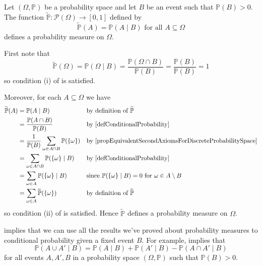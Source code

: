 \begin{proposition}
\label{propConditionalProbabilityIsProbabilityMeasure}
Let $(\Omega,\mathbb{P})$ be a probability space and let $B$ be an event such that $\mathbb{P}(B)>0$. The function $\widetilde{\mathbb{P}} : \mathcal{P}(\Omega) \to [0,1]$ defined by
\[ \widetilde{\mathbb{P}}(A) = \mathbb{P}(A \mid B) \text{ for all } A \subseteq \Omega \]
defines a probability measure on $\Omega$.
\end{proposition}
\begin{cproof}
First note that
\[ \widetilde{\mathbb{P}}(\Omega) = \mathbb{P}(\Omega \mid B) = \frac{\mathbb{P}(\Omega \cap B)}{\mathbb{P}(B)} = \frac{\mathbb{P}(B)}{\mathbb{P}(B)} = 1 \]
so condition (i) of  is satisfied.

Moreover, for each $A \subseteq \Omega$ we have
\begin{align*}
\widetilde{\mathbb{P}}(A) &= \mathbb{P}(A \mid B) && \text{by definition of $\widetilde{\mathbb{P}}$} \\
&= \frac{\mathbb{P}(A \cap B)}{\mathbb{P}(B)} && \text{by \Cref{defConditionalProbability}} \\
&= \frac{1}{\mathbb{P}(B)} \sum_{\omega \in A \cap B} \mathbb{P}(\{\omega\}) && \text{by \Cref{propEquivalentSecondAxiomsForDiscreteProbabilitySpace}} \\
&= \sum_{\omega \in A \cap B} \mathbb{P}(\{\omega\} \mid B) && \text{by \Cref{defConditionalProbability}} \\
&= \sum_{\omega \in A} \mathbb{P}(\{\omega\} \mid B) && \text{since $\mathbb{P}(\{\omega\} \mid B) = 0$ for $\omega \in A \setminus B$} \\
&= \sum_{\omega \in A} \widetilde{\mathbb{P}}(\{\omega\}) && \text{by definition of $\widetilde{\mathbb{P}}$}
\end{align*}
so condition (ii) of  is satisfied. Hence $\widetilde{\mathbb{P}}$ defines a probability measure on $\Omega$.
\end{cproof}

 implies that we can use all the results we've proved about probability measures to conditional probability given a fixed event $B$. For example,  implies that
\[ \mathbb{P}(A \cup A' \mid B) = \mathbb{P}(A \mid B) + \mathbb{P}(A' \mid B) - \mathbb{P}(A \cap A' \mid B) \]
for all events $A,A',B$ in a probability space $(\Omega,\mathbb{P})$ such that $\mathbb{P}(B)>0$.

